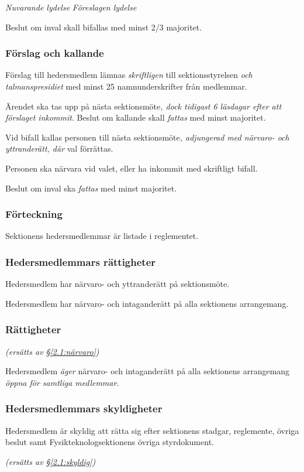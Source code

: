 \documentclass{article}
\newenvironment{lydelse}
    {\begin{paracol}{2}%
        \emph{Nuvarande lydelse}%
        \switchcolumn%
        \emph{Föreslagen lydelse}%
    \end{paracol}%
    \begin{enumerate}[label=\thesubsection.\arabic*]%
    \begin{paracol}{2}%
    }{\end{paracol}\end{enumerate}}
\newcommand{\itemb}{\item[\textbullet]}
\begin{document}
\begin{lydelse}
    \itemb Beslut om inval skall bifallas med minst 2/3 majoritet.
    
\switchcolumn
    \subsubsection*{Förslag och kallande}%
    
    \item Förslag till hedersmedlem lämnas \emph{skriftligen} till sektionsstyrelsen \emph{och talmanspresidiet} med minst 25 namnunderskrifter från medlemmar.

    \item Ärendet ska tas upp på nästa sektionsmöte\emph{, dock tidigast 6 läsdagar efter att förslaget inkommit}.
    Beslut om kallande skall \emph{fattas} med minst  majoritet.
    
    \item Vid bifall kallas personen till nästa sektionsmöte\emph{, adjungerad med närvaro- och yttranderätt, där} val förrättas.

    \item Personen ska närvara vid valet, eller ha inkommit med skriftligt bifall.

    \item Beslut om inval ska \emph{fattas} med minst  majoritet.
    
\switchcolumn*
    \subsubsection*{Förteckning}%
    \itemb Sektionens hedersmedlemmar är listade i reglementet.
    
\switchcolumn
\switchcolumn*
    \subsubsection*{Hedersmedlemmars rättigheter}%
    \itemb Hedersmedlem har närvaro- och yttranderätt på sektionsmöte.
    
    \itemb Hedersmedlem har närvaro- och intaganderätt på alla sektionens
arrangemang.
    
\switchcolumn
    \subsubsection*{Rättigheter}%
    \emph{(ersätts av \S \ref{2.1:närvaro})}
    
    \item Hedersmedlem \emph{äger} närvaro- och intaganderätt på alla sektionens arrangemang \emph{öppna för samtliga medlemmar}.

\switchcolumn*
    \subsubsection*{Hedersmedlemmars skyldigheter}%
    \itemb Hedersmedlem är skyldig att rätta sig efter sektionens stadgar, regle\-mente, övriga beslut samt  Fysikteknologsektionens övriga styrdokument.
    
\switchcolumn
    \emph{(ersätts av \S \ref{2.1:skyldig})}
\end{lydelse}
\end{document}
